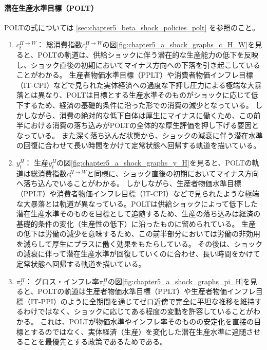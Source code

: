 \paragraph{潜在生産水準目標（POLT）}
\label{sec:chapter5_a_shock_policies_polt}
POLTの式については
\ref{sec:chapter5_beta_shock_policies_polt}
を参照のこと。
\begin{enumerate}
    \item
    \label{itm:chapter5_a_shock_policies_polt_c_H_W}
        \(c_t^{H\to W}\)：
        総消費指数\(c_t^{H\to W}\)の図\ref{fig:chapter5_a_shock_graphs_c_H_W}を見ると、POLTの軌道は、供給ショックに伴う潜在的な生産能力の低下を反映し、ショック直後の初期においてマイナス方向への下落を引き起こしていることがわかる。
        生産者物価水準目標（PPLT）や消費者物価インフレ目標（IT-CPI）などで見られた実体経済への過度な下押し圧力による極端な大暴落とは異なり、POLTは目標とする生産水準そのものがショックに応じて低下するため、経済の基礎的条件に沿った形での消費の減少となっている。
        しかしながら、消費の絶対的な低下自体は厚生にマイナスに働くため、この前半における消費の落ち込みがPOLTの全体的な厚生評価を押し下げる要因となっている。
        また深く落ち込んだ状態から、ショックの減衰に伴う潜在水準の回復に合わせて長い時間をかけて定常状態へ回帰する軌道を描いている。
    \item
    \label{itm:chapter5_a_shock_policies_polt_y_H}
        \(y_t^H\)：
        生産\(y_t^H\)の図\ref{fig:chapter5_a_shock_graphs_y_H}を見ると、POLTの軌道は総消費指数\(c_t^{H\to W}\)と同様に、ショック直後の初期においてマイナス方向へ落ち込んでいることがわかる。
        しかしながら、生産者物価水準目標（PPLT）や消費者物価インフレ目標（IT-CPI）などで見られたような極端な大暴落とは軌道が異なっている。POLTは供給ショックによって低下した潜在生産水準そのものを目標として追随するため、生産の落ち込みは経済の基礎的条件の変化（生産性の低下）に沿ったものに留められている。
        生産の低下は労働の減少を意味するため、この前半部分においては労働の非効用を減らして厚生にプラスに働く効果をもたらしている。
        その後は、ショックの減衰に伴って潜在生産水準が回復していくのに合わせ、長い時間をかけて定常状態へ回帰する軌道を描いている。
    \item
    \label{itm:chapter5_a_shock_policies_polt_pi_H}
        \(\pi_t^H\)：
        グロス・インフレ率\(\pi_t^H\)の図\ref{fig:chapter5_a_shock_graphs_pi_H}を見ると、POLTの軌道は生産者物価水準目標（PPLT）や生産者物価インフレ目標（IT-PPI）のように全期間を通じてゼロ近傍で完全に平坦な推移を維持するわけではなく、ショックに応じてある程度の変動を許容していることがわかる。
        これは、POLTが物価水準やインフレ率そのものの安定化を直接の目標とするのではなく、実体経済（生産）を変化した潜在生産水準に追随させることを最優先とする政策であるためである。

\end{enumerate}
